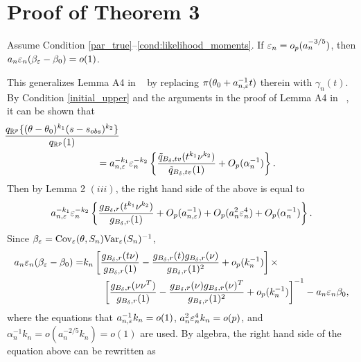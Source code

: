 
\section{Proof of Theorem 3}

\begin{lemma}\label{Alemma5} 
Assume Condition \ref{par_true}--\ref{cond:likelihood_moments}. If $\varepsilon_{n}=o_{p}(a_{n}^{-3/5})$, then $a_{n}\varepsilon_{n}(\beta_{\varepsilon}-\beta_{0})=o(1)$.
\end{lemma}
	This generalizes Lemma A4 in ~\cite{Li2017} by replacing $\pi(\theta_{0}+a_{n,\varepsilon}^{-1}t)$
	therein with $\gamma_{n}(t)$. By Condition \ref{initial_upper} and the arguments in the proof
	of Lemma A4 in ~\cite{Li2017}, it can be shown that 
	\begin{eqnarray*}
	&\hspace{-3cm}\frac{q_{\mathbb{R}^{p}}\{(\theta-\theta_{0})^{k_{1}}(s-s_{\rm obs})^{k_{2}}\}}{q_{\mathbb{R}^{p}}(1)}\\
	&\quad=a_{n,\veps}^{-k_{1}}\veps_{n}^{-k_{2}}\left\{ \frac{\tilde{q}_{B_{\delta},tv}(t^{k_{1}}\nu^{k_{2}})}{\tilde{q}_{B_{\delta},tv}(1)}+O_{p}(\alpha_{n}^{-1})\right\} .
	\end{eqnarray*}
	Then by Lemma 2 $(iii)$, the right hand side of the above is equal
	to 
	\[
	a_{n,\varepsilon}^{-k_{1}}\varepsilon_{n}^{-k_{2}}\left\{ \frac{g_{B_{\delta},r}(t^{k_{1}}\nu^{k_{2}})}{g_{B_{\delta},r}(1)}+O_{p}(a_{n,\varepsilon}^{-1})+O_{p}(a_{n}^{2}\varepsilon_{n}^{4})+O_{p}(\alpha_{n}^{-1})\right\} .
	\]
	Since $\beta_{\varepsilon}=\text{Cov}_{\varepsilon}(\theta,S_{n})\text{Var}_{\varepsilon}(S_{n})^{-1}$,
	\begin{align*}
	a_{n}\varepsilon_{n}(\beta_{\varepsilon}-\beta_{0})= & k_{n}\left[\frac{g_{B_{\delta},r}(t\nu)}{g_{B_{\delta},r}(1)}-\frac{g_{B_{\delta},r}(t)g_{B_{\delta},r}(\nu)}{g_{B_{\delta},r}(1)^{2}}+o_{p}(k_{n}^{-1})\right]\times\\
	& \qquad\left[\frac{g_{B_{\delta},r}(\nu\nu^{T})}{g_{B_{\delta},r}(1)}-\frac{g_{B_{\delta},r}(\nu)g_{B_{\delta},r}(\nu)^{T}}{g_{B_{\delta},r}(1)^{2}}+o_{p}(k_{n}^{-1})\right]^{-1}-a_{n}\varepsilon_{n}\beta_{0},
	\end{align*}
	where the equations that $a_{n,\varepsilon}^{-1}k_{n}=o(1)$, $a_{n}^{2}\varepsilon_{n}^{4}k_{n}=o(p)$,
	and $\alpha_{n}^{-1}k_{n}=o(a_{n}^{-2/5}k_{n})=o(1)$ are used. By
	algebra, the right hand side of the equation above can be rewritten
	as 
